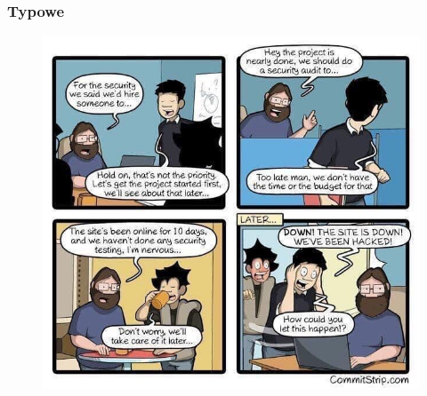 \documentclass[10pt,t]{beamer}
\begin{document}
\begin{frame}
  \frametitle{Typowe}


  \begin{figure}

    \centering


    \includegraphics[scale=0.34]
    {./PresentationsPictures/Security-01.jpg}

  \end{figure}

\end{frame}





























\end{document}
